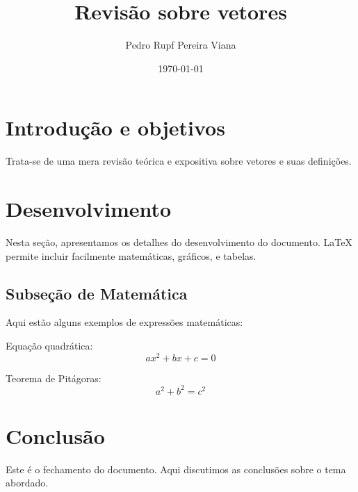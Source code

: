 \documentclass[a4paper,12pt]{article}
\title{Revisão sobre vetores}
\author{Pedro Rupf Pereira Viana}
\date{\today}
\begin{document}
\maketitle

\section{Introdução e objetivos}
Trata-se de uma mera revisão teórica e expositiva sobre vetores e suas definições.

\section{Desenvolvimento}  %
Nesta seção, apresentamos os detalhes do desenvolvimento do documento. LaTeX permite incluir facilmente matemáticas, gráficos, e tabelas.

\subsection{Subseção de Matemática}  %
Aqui estão alguns exemplos de expressões matemáticas:

Equação quadrática: 
\[ax^2 + bx + c = 0\]

Teorema de Pitágoras:
\[a^2 + b^2 = c^2\]

\section{Conclusão}  %
Este é o fechamento do documento. Aqui discutimos as conclusões sobre o tema abordado.
\end{document}
